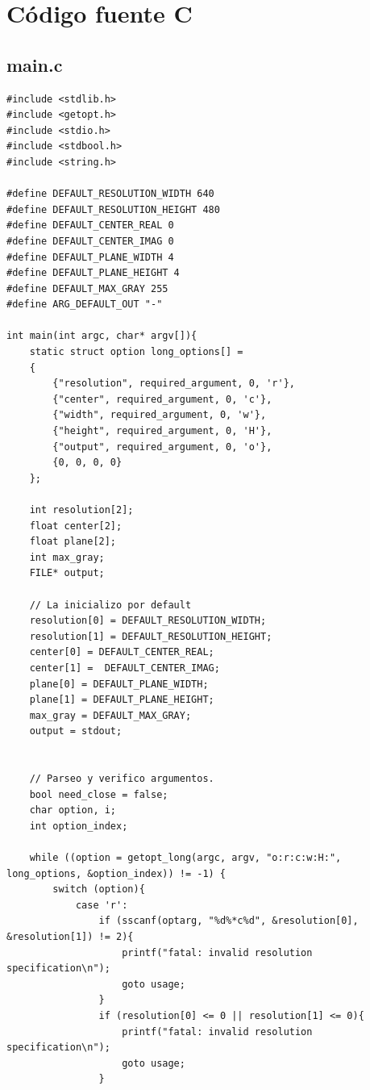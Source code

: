 \documentclass[a4paper,10pt]{article}
\begin{document}
\section{C\'odigo fuente C}

\subsection{main.c}

\begin{verbatim}
#include <stdlib.h>
#include <getopt.h>
#include <stdio.h>
#include <stdbool.h>
#include <string.h>

#define DEFAULT_RESOLUTION_WIDTH 640
#define DEFAULT_RESOLUTION_HEIGHT 480
#define DEFAULT_CENTER_REAL 0
#define DEFAULT_CENTER_IMAG 0
#define DEFAULT_PLANE_WIDTH 4
#define DEFAULT_PLANE_HEIGHT 4
#define DEFAULT_MAX_GRAY 255
#define ARG_DEFAULT_OUT "-"

int main(int argc, char* argv[]){
    static struct option long_options[] =
    {
        {"resolution", required_argument, 0, 'r'},
        {"center", required_argument, 0, 'c'},
        {"width", required_argument, 0, 'w'},
        {"height", required_argument, 0, 'H'},
        {"output", required_argument, 0, 'o'},
        {0, 0, 0, 0}
    };

    int resolution[2];
    float center[2];
    float plane[2];
	int max_gray;
    FILE* output;
	
	// La inicializo por default
	resolution[0] = DEFAULT_RESOLUTION_WIDTH;
    resolution[1] = DEFAULT_RESOLUTION_HEIGHT;
    center[0] = DEFAULT_CENTER_REAL;
    center[1] =  DEFAULT_CENTER_IMAG;
    plane[0] = DEFAULT_PLANE_WIDTH;
    plane[1] = DEFAULT_PLANE_HEIGHT;
	max_gray = DEFAULT_MAX_GRAY;
    output = stdout;
	

	// Parseo y verifico argumentos.
    bool need_close = false;
    char option, i;
    int option_index;

    while ((option = getopt_long(argc, argv, "o:r:c:w:H:", long_options, &option_index)) != -1) {
        switch (option){
            case 'r':
                if (sscanf(optarg, "%d%*c%d", &resolution[0], &resolution[1]) != 2){
                    printf("fatal: invalid resolution specification\n");
                    goto usage;
                }
                if (resolution[0] <= 0 || resolution[1] <= 0){
                    printf("fatal: invalid resolution specification\n");
                    goto usage;
                }


\end{verbatim}
\end{document}
